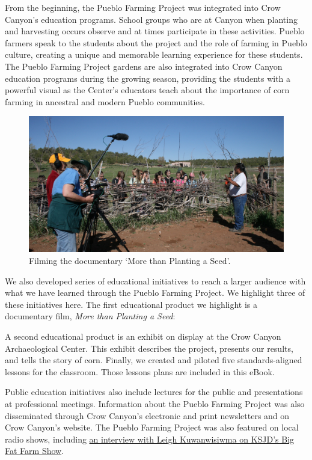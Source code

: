 \documentclass[12pt,]{article}
\begin{document}
From the beginning, the Pueblo Farming Project was integrated into Crow Canyon's education programs. School groups who are at Canyon when planting and harvesting occurs observe and at times participate in these activities. Pueblo farmers speak to the students about the project and the role of farming in Pueblo culture, creating a unique and memorable learning experience for these students. The Pueblo Farming Project gardens are also integrated into Crow Canyon education programs during the growing season, providing the students with a powerful visual as the Center's educators teach about the importance of corn farming in ancestral and modern Pueblo communities.

\begin{figure}
\centering
\includegraphics{./images/section_1.1_documentary.jpg}
\caption{Filming the documentary `More than Planting a Seed'.}
\end{figure}

We also developed series of educational initiatives to reach a larger audience with what we have learned through the Pueblo Farming Project. We highlight three of these initiatives here. The first educational product we highlight is a documentary film, \emph{More than Planting a Seed}:

A second educational product is an exhibit on display at the Crow Canyon Archaeological Center. This exhibit describes the project, presents our results, and tells the story of corn. Finally, we created and piloted five standards-aligned lessons for the classroom. Those lessons plans are included in this eBook.

Public education initiatives also include lectures for the public and presentations at professional meetings. Information about the Pueblo Farming Project was also disseminated through Crow Canyon's electronic and print newsletters and on Crow Canyon's website. The Pueblo Farming Project was also featured on local radio shows, including \href{http://ksjd.org/post/pueblo-farming-project\#stream/0}{an interview with Leigh Kuwanwisiwma on KSJD's Big Fat Farm Show}.
\end{document}
